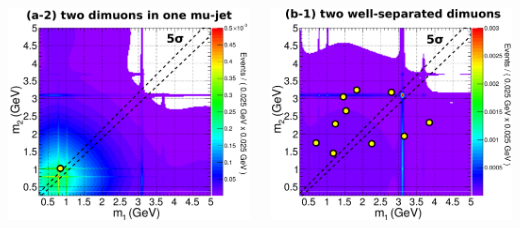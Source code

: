 \documentclass[compress]{beamer}
\begin{document}
\begin{frame}
\begin{columns}
\includegraphics[width=\linewidth]{a2_2dpdf.pdf}

\includegraphics[width=\linewidth]{b1_2dpdf.pdf}
\end{columns}
\end{frame}
\end{document}
